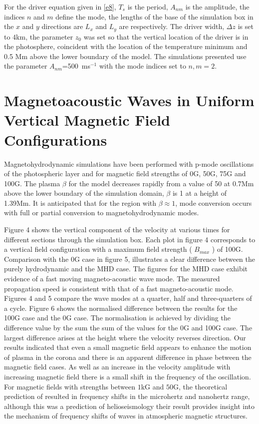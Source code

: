 \documentclass[linenumbers]{aastex63}
\begin{document}
For the driver equation given in \ref{e8}, $T_{s}$ is the period, $A_{nm}$ is the amplitude, the indices $n$ and $m$ define the mode, the lengths of the base of the simulation box in the $x$ and $y$ directions are $L_{x}$ and $L_{y}$ are  respectively. The driver width, $\Delta z$ is set to $4$km, the parameter $z_{0}$ was set so that the vertical location of the driver is in the photosphere, coincident with the location of the temperature minimum and 0.5 Mm above the lower boundary of the model. The simulations presented use the parameter $A_{nm}$=500\, ms$^{-1}$ with the mode indices set to $n,m=2$. 





\section{Magnetoacoustic Waves in Uniform Vertical Magnetic Field Configurations}
Magnetohydrodynamic simulations have been performed with p-mode oscillations of the photospheric layer and for magnetic field strengths of 0G, 50G, 75G and 100G. The plasma $\beta$ for the model decreases rapidly from a value of 50 at 0.7Mm above the lower boundary of the simulation domain, $\beta$ is 1 at a height of 1.39Mm.  It is anticipated that for the region with $\beta \approx 1$, mode conversion occurs with full or partial conversion to magnetohydrodynamic modes. 

 Figure 4 %
 shows the vertical component of the velocity at various times for different sections through the simulation box. Each plot in  figure 4 %
 corresponds to a vertical field configuration with a maximum field strength ( $ B_{max} $ ) of 100G. Comparison with the 0G case in figure 5, %
  illustrates a clear difference between the purely hydrodynamic and the MHD case. The figures for the MHD case exhibit evidence of a fast moving magneto-acoustic wave mode. The measured propagation speed is consistent with that of a fast magneto-acoustic mode. Figures 4 and 5 compare the wave modes at a quarter, half and three-quarters of a cycle. Figure 6 shows the normalised difference between the results for the 100G case and the 0G case. The normalisation is achieved by dividing the difference value  by the sum the sum of the values for the 0G and 100G case. The largest difference arises at the height where the velocity reverses direction.   Our results indicated that even a small magnetic field appears to enhance the motion of plasma in the corona and  there is an apparent difference in phase between the magnetic field cases. As well as an increase in the velocity amplitude with increasing magnetic field there is a small shift in the frequency of the oscillation. For magnetic fields with strengths between $1$kG and $50$G, the theoretical prediction of \citet{Hindman1996} resulted in frequency shifts in the microhertz and nanohertz range,  although this was a prediction of helioseismology their result provides insight into the mechanism of frequency shifts of waves in atmospheric magnetic structures. 
\end{document}
